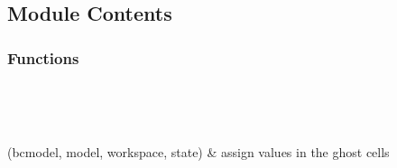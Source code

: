 \documentclass[letterpaper,10pt,english]{sphinxmanual}
\begin{document}
\subsection{Module Contents}
\label{\detokenize{autoapi/halo/index:module-contents}}

\subsubsection{Functions}
\label{\detokenize{autoapi/halo/index:functions}}

\begin{savenotes}\sphinxatlongtablestart\begin{longtable}[c]{}
\hline

\endfirsthead

%
{}\\
\hline

\endhead

\hline
{}\\
\endfoot

\endlastfoot

\sphinxAtStartPar
{\hyperref[\detokenize{autoapi/halo/index:halo.halo}]{}}(bcmodel, model, workspace, state)
&
\sphinxAtStartPar
assign values in the ghost cells
\\
\hline
\end{longtable}\sphinxatlongtableend\end{savenotes}
\end{document}
